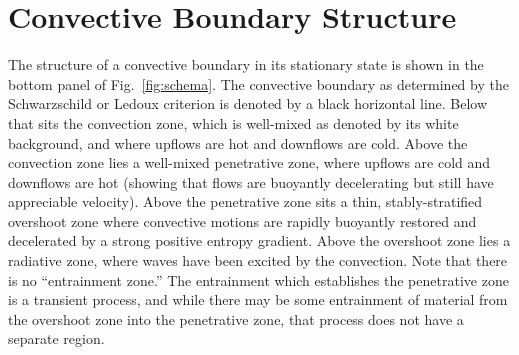 \section{Convective Boundary Structure}
\label{sec:structure}
The structure of a convective boundary in its stationary state is shown in the bottom panel of Fig.~\ref{fig:schema}.
The convective boundary as determined by the Schwarzschild or Ledoux criterion is denoted by a black horizontal line.
Below that sits the convection zone, which is well-mixed as denoted by its white background, and where upflows are hot and downflows are cold.
Above the convection zone lies a well-mixed penetrative zone, where upflows are cold and downflows are hot (showing that flows are buoyantly decelerating but still have appreciable velocity).
Above the penetrative zone sits a thin, stably-stratified overshoot zone where convective motions are rapidly buoyantly restored and decelerated by a strong positive entropy gradient.
Above the overshoot zone lies a radiative zone, where waves have been excited by the convection.
Note that there is no ``entrainment zone.''
The entrainment which establishes the penetrative zone is a transient process, and while there may be some entrainment of material from the overshoot zone into the penetrative zone, that process does not have a separate region.

